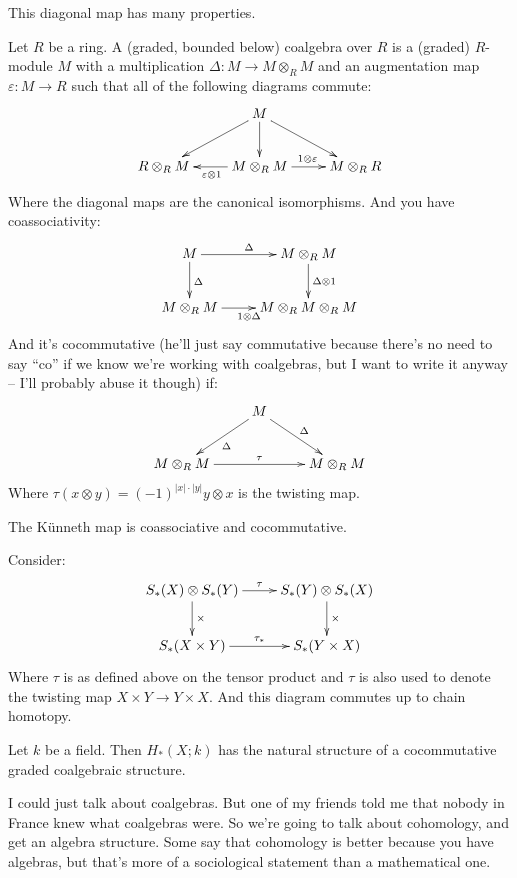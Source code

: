This diagonal map has many properties.
\begin{definition}
Let $R$ be a ring. A (graded, bounded below) coalgebra over $R$ is a (graded) $R$-module $M$ with a multiplication $\Delta:M\to M\otimes_R M$ and an augmentation map $\varepsilon:M\to R$ such that all of the following diagrams commute:
\begin{equation*}
\xymatrix{ & M\ar[d]\ar[dr]\ar[dl] & \\
R\otimes_R M & M\otimes_R M\ar[l]^{\varepsilon\otimes 1}\ar[r]^{1\otimes\varepsilon} & M\otimes_R R}
\end{equation*}
Where the diagonal maps are the canonical isomorphisms. And you have coassociativity:
\begin{equation*}
\xymatrix{
	M\ar[r]^{\Delta}\ar[d]^{\Delta} & M\otimes_R M\ar[d]^{\Delta\otimes 1}\\
	M\otimes_R M\ar[r]_{1\otimes\Delta} & M\otimes_R M\otimes_R M
}
\end{equation*}
And it's cocommutative (he'll just say commutative because there's no need to say ``co'' if we know we're working with coalgebras, but I want to write it anyway -- I'll probably abuse it though) if:
\begin{equation*}
\xymatrix{
	 & M\ar[dl]^\Delta\ar[dr]^\Delta &\\
	M\otimes_R M\ar[rr]^{\tau} & & M\otimes_R M
}
\end{equation*}
Where $\tau(x\otimes y)=(-1)^{|x|\cdot|y|}y\otimes x$ is the twisting map.
\end{definition}
\begin{example}
The K\"{u}nneth map is coassociative and cocommutative.
\end{example}
Consider:
\begin{equation*}
\xymatrix{S_\ast(X)\otimes S_\ast(Y)\ar[r]^{\tau}\ar[d]^{\times} & S_\ast(Y)\otimes S_\ast(X)\ar[d]^{\times}\\
S_\ast(X\times Y)\ar[r]^{\tau_\ast} & S_\ast(Y\times X)}
\end{equation*}
Where $\tau$ is as defined above on the tensor product and $\tau$ is also used to denote the twisting map $X\times Y\to Y\times X$. And this diagram commutes up to chain homotopy.
\begin{corollary}
Let $k$ be a field. Then $ H_\ast(X;k)$ has the natural structure of a cocommutative graded coalgebraic structure. 
\end{corollary}
I could just talk about coalgebras. But one of my friends told me that nobody in France knew what coalgebras were. So we're going to talk about cohomology, and get an algebra structure. Some say that cohomology is better because you have algebras, but that's more of a sociological statement than a mathematical one.
